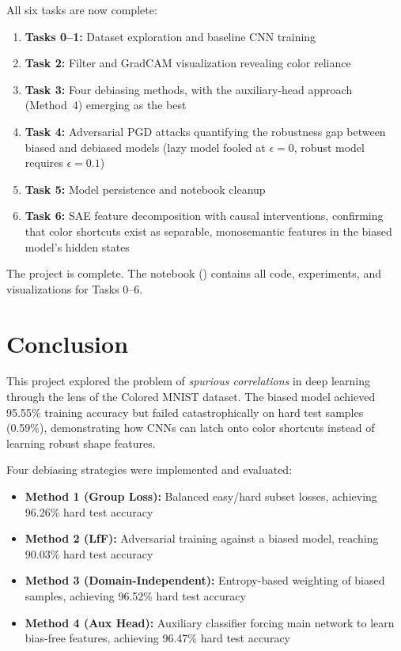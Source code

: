 \documentclass[9pt,a4paper,twocolumn,twoside]{tau-class/tau}
\begin{document}
        All six tasks are now complete:
        \begin{enumerate}
            \item \textbf{Tasks 0--1:} Dataset exploration and baseline CNN training
            \item \textbf{Task 2:} Filter and GradCAM visualization revealing color reliance
            \item \textbf{Task 3:} Four debiasing methods, with the auxiliary-head approach (Method~4) emerging as the best
            \item \textbf{Task 4:} Adversarial PGD attacks quantifying the robustness gap between biased and debiased models (lazy model fooled at $\epsilon = 0$, robust model requires $\epsilon = 0.1$)
            \item \textbf{Task 5:} Model persistence and notebook cleanup
            \item \textbf{Task 6:} SAE feature decomposition with causal interventions, confirming that color shortcuts exist as separable, monosemantic features in the biased model's hidden states
        \end{enumerate}

        The project is complete. The notebook () contains all code, experiments, and visualizations for Tasks 0--6.


\section{Conclusion}

    This project explored the problem of \textit{spurious correlations} in deep learning through the lens of the Colored MNIST dataset. The biased model achieved 95.55\% training accuracy but failed catastrophically on hard test samples (0.59\%), demonstrating how CNNs can latch onto color shortcuts instead of learning robust shape features.

    Four debiasing strategies were implemented and evaluated:
    \begin{itemize}
        \item \textbf{Method 1 (Group Loss):} Balanced easy/hard subset losses, achieving 96.26\% hard test accuracy
        \item \textbf{Method 2 (LfF):} Adversarial training against a biased model, reaching 90.03\% hard test accuracy
        \item \textbf{Method 3 (Domain-Independent):} Entropy-based weighting of biased samples, achieving 96.52\% hard test accuracy
        \item \textbf{Method 4 (Aux Head):} Auxiliary classifier forcing main network to learn bias-free features, achieving 96.47\% hard test accuracy
    \end{itemize}
\end{document}
